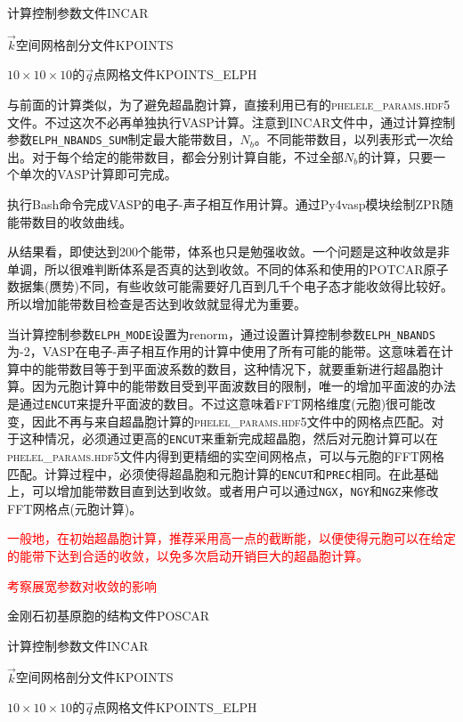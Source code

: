 计算控制参数文件\textrm{INCAR}

$\vec k$空间网格剖分文件\textrm{KPOINTS}

$10\times10\times10$的$\vec q$点网格文件\textrm{KPOINTS\_ELPH}

与前面的计算类似，为了避免超晶胞计算，直接利用已有的\textsc{phelele\_params.hdf5}文件。不过这次不必再单独执行\textrm{VASP}计算。注意到\textrm{INCAR}文件中，通过计算控制参数\texttt{ELPH\_NBANDS\_SUM}制定最大能带数目，$N_b$。不同能带数目，以列表形式一次给出。对于每个给定的能带数目，都会分别计算自能，不过全部$N_b$的计算，只要一个单次的\textrm{VASP}计算即可完成。

执行\textrm{Bash}命令完成\textrm{VASP}的电子-声子相互作用计算。通过\textrm{Py4vasp}模块绘制\textrm{ZPR}随能带数目的收敛曲线。

从结果看，即使达到200个能带，体系也只是勉强收敛。一个问题是这种收敛是非单调，所以很难判断体系是否真的达到收敛。不同的体系和使用的\textrm{POTCAR}原子数据集(赝势)不同，有些收敛可能需要好几百到几千个电子态才能收敛得比较好。所以增加能带数目检查是否达到收敛就显得尤为重要。

当计算控制参数\texttt{ELPH\_MODE}设置为\textrm{renorm}，通过设置计算控制参数\texttt{ELPH\_NBANDS}为-2，\textrm{VASP}在电子-声子相互作用的计算中使用了所有可能的能带。这意味着在计算中的能带数目等于到平面波系数的数目，这种情况下，就要重新进行超晶胞计算。因为元胞计算中的能带数目受到平面波数目的限制，唯一的增加平面波的办法是通过\texttt{ENCUT}来提升平面波的数目。不过这意味着\textrm{FFT}网格维度(元胞)很可能改变，因此不再与来自超晶胞计算的\textsc{phelel\_params.hdf5}文件中的网格点匹配。对于这种情况，必须通过更高的\texttt{ENCUT}来重新完成超晶胞，然后对元胞计算可以在\textsc{phelel\_params.hdf5}文件内得到更精细的实空间网格点，可以与元胞的\textrm{FFT}网格匹配。计算过程中，必须使得超晶胞和元胞计算的\texttt{ENCUT}和\texttt{PREC}相同。在此基础上，可以增加能带数目直到达到收敛。或者用户可以通过\texttt{NGX}，\texttt{NGY}和\texttt{NGZ}来修改\textrm{FFT}网格点(元胞计算)。

\textcolor{red}{一般地，在初始超晶胞计算，推荐采用高一点的截断能，以便使得元胞可以在给定的能带下达到合适的收敛，以免多次启动开销巨大的超晶胞计算。}

\textcolor{red}{考察展宽参数对收敛的影响}

金刚石初基原胞的结构文件\textrm{POSCAR}

计算控制参数文件\textrm{INCAR}

$\vec k$空间网格剖分文件\textrm{KPOINTS}

$10\times10\times10$的$\vec q$点网格文件\textrm{KPOINTS\_ELPH}

